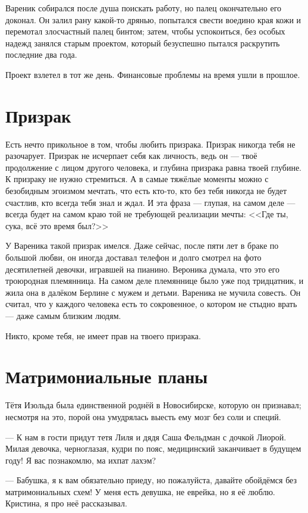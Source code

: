 \documentclass[a4paper,10pt,fleqn]{book}\usepackage{polyglossia}\setdefaultlanguage{english}\setotherlanguage{russian}\defaultfontfeatures{Ligatures=TeX,Mapping=tex-text} \usepackage{xcolor}\definecolor{lightgray}{HTML}{bbbbbb}\color{lightgray}\newcommand{\ml}[3]{\textcolor{black}{#3}}
\begin{document}
Вареник собирался после душа поискать работу, но палец окончательно его доконал.
Он залил рану какой-то дрянью, попытался свести воедино края кожи и перемотал злосчастный палец бинтом;
затем, чтобы успокоиться, без особых надежд занялся старым проектом, который безуспешно пытался раскрутить последние два года.

Проект взлетел в тот же день.
Финансовые проблемы на время ушли в прошлое.

\section{Призрак}

Есть нечто прикольное в том, чтобы любить призрака.
Призрак никогда тебя не разочарует.
Призрак не исчерпает себя как личность, ведь он --- твоё продолжение с лицом другого человека, и глубина призрака равна твоей глубине.
К призраку не нужно стремиться.
А в самые тяжёлые моменты можно с безобидным эгоизмом мечтать, что есть кто-то, кто без тебя никогда не будет счастлив, кто всегда тебя знал и ждал.
И эта фраза --- глупая, на самом деле --- всегда будет на самом краю той не требующей реализации мечты: <<Где ты, сука, всё это время был?>>

У Вареника такой призрак имелся.
Даже сейчас, после пяти лет в браке по большой любви, он иногда доставал телефон и долго смотрел на фото десятилетней девочки, игравшей на пианино.
Вероника думала, что это его троюродная племянница.
На самом деле племяннице было уже под тридцатник, и жила она в далёком Берлине с мужем и детьми.
Вареника не мучила совесть.
Он считал, что у каждого человека есть то сокровенное, о котором не стыдно врать --- даже самым близким людям.

Никто, кроме тебя, не имеет прав на твоего призрака.

\section{Матримониальные планы}

Тётя Изольда была единственной роднёй в Новосибирске, которую он признавал;
несмотря на это, порой она умудрялась выесть ему мозг без соли и специй.

--- К нам в гости придут тетя Лиля и дядя Саша Фельдман с дочкой Лиорой.
Милая девочка, черноглазая, кудри по пояс, медицинский заканчивает в будущем году!
Я вас познакомлю, ма ихпат лахэм?

--- Бабушка, я к вам обязательно приеду, но пожалуйста, давайте обойдёмся без матримониальных схем!
У меня есть девушка, не еврейка, но я её люблю.
Кристина, я про неё рассказывал.
\end{document}
